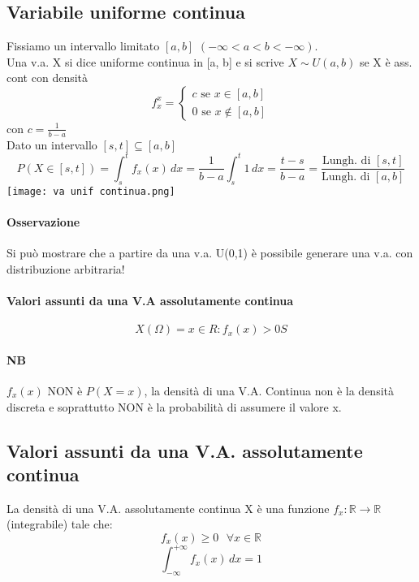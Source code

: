 	\subsection{Variabile uniforme continua}
	Fissiamo un intervallo limitato $[a, b]$ $(-\infty < a < b < -\infty)$.
	\\ Una v.a. X si dice uniforme continua in [a, b] e si scrive $X \sim U(a, b)$
	se X è ass. cont con densità
	\begin{equation*}
		f_x^{x} =
		\begin{cases}
			c \text{ se } x \in [a, b] \\
			0 \text{ se } x \notin [a, b]
		\end{cases}
	\end{equation*}
	con $c = \frac{1}{b-a}$
	\\ Dato un intervallo $[s, t] \subseteq [a, b]$
	\begin{equation*}
		P(X \in [s,t]) = \int_s^t f_x (x) \,dx =
		\frac{1}{b -a} \int_s^t 1 \,dx = \frac{t-s}{b-a} =
		\frac{\text{Lungh. di } [s,t]}{\text{Lungh. di } [a, b]}
	\end{equation*}
	\texttt{[image: va unif continua.png]}
	\paragraph*{Osservazione} Si può mostrare che a partire da una v.a. U(0,1) è possibile
	generare una v.a. con distribuzione arbitraria!

	\paragraph*{Valori assunti da una V.A assolutamente continua}
	\begin{equation*}
		X(\Omega) = {x \in R: f_x(x) > 0S}
	\end{equation*}

	\paragraph{NB} $f_x(x)$ NON è $P(X=x)$, la densità  di una V.A. Continua non è la densità discreta
	e soprattutto NON è la probabilità di assumere il valore x.

	\subsection{Valori assunti da una V.A. assolutamente continua}
	La densità di una V.A. assolutamente continua X è una funzione $f_x:\mathbb{R} \rightarrow \mathbb{R}$ (integrabile)
	tale che:
	\begin{equation*}
		f_x(x) \geq 0 \textrm{ } \forall x \in  \mathbb{R}
	\end{equation*}
	\begin{equation*}
		\int_{-\infty}^{+\infty} f_x(x)  \,dx = 1
	\end{equation*}

